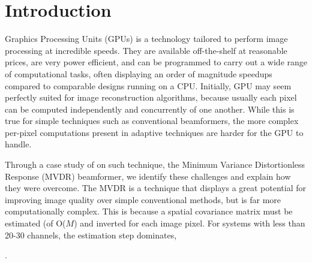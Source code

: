 \documentclass[
a4paper,10pt
]{ica2013_2}
\newcommand\1{\vec 1}
\begin{document}


\section{Introduction}

Graphics Processing Units (GPUs) is a technology tailored to perform image processing at incredible speeds. They are available off-the-shelf at reasonable prices, are very power efficient, and can be programmed to carry out a wide range of computational tasks, often displaying an order of magnitude speedups compared to comparable designs running on a CPU. Initially, GPU may seem perfectly suited for image reconstruction algorithms, because usually each pixel can be computed independently and concurrently of one another. While this is true for simple techniques such as conventional beamformers, the more complex per-pixel computations present in adaptive techniques are harder for the GPU to handle.


Through a case study of on such technique, the Minimum Variance Distortionless Response (MVDR) beamformer, we identify these challenges and explain how they were overcome. The MVDR is a technique that displays a great potential for improving image quality over simple conventional methods, but is far more computationally complex. This is because a spatial covariance matrix must be estimated (of O($M$) and inverted for each image pixel.    For systems with less than 20-30 channels, the estimation step dominates,   %

 .
\end{document}

